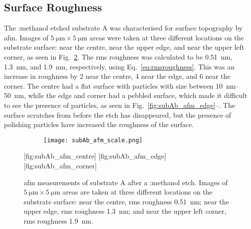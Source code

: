 \subsection{Surface Roughness}

The :methanol etched substrate A was characterised for surface topography by \ac{afm}. Images of $\SI{5}{\micro\metre}\times\SI{5}{\micro\metre}$ areas were taken at three different locations on the substrate surface: near the centre, near the upper edge, and near the upper left corner, as seen in Fig.~\ref{fig:subAb_afm}. The \ac{rms} roughness was calculated to be \SI{0.51}{\nano\metre}, \SI{1.3}{\nano\metre}, and \SI{1.9}{\nano\metre}, respectively, using Eq.~\ref{eq:rmsroughness}. This was an increase in roughness by 2 near the centre, 4 near the edge, and 6 near the corner. The centre had a flat surface with particles with size between \SIrange{10}{50}{\nano\metre}, while the edge and corner had a pebbled surface, which made it difficult to see the presence of particles, as seen in Fig.~\ref{fig:subAb_afm_edge}--. The surface scratches from before the etch has disappeared, but the presence of polishing particles have increased the roughness of the surface.

\begin{figure}[htbp]
    \centering
    \begin{subfigure}[c]{0.032\linewidth}
        \label{fig:subAb_afm_scale}\captionsetup{list=no}
        \texttt{[image: subAb\_afm\_scale.png]}
    \end{subfigure}
    \hfill
    [fig:subAb_afm_centre] %
    \hfill
    [fig:subAb_afm_edge] %
    \hfill
    [fig:subAb_afm_corner]%
    \caption[\Ac{afm} of substrate A after a :methanol etch.]{\Ac{afm} measurements of substrate A after a :methanol etch. Images of $\SI{5}{\micro\metre}\times\SI{5}{\micro\metre}$ areas are taken at three different locations on the substrate surface:  near the centre, \ac{rms} roughness \SI{0.51}{\nano\metre};  near the upper edge, \ac{rms} roughness \SI{1.3}{\nano\metre}; and  near the upper left corner, \ac{rms} roughness \SI{1.9}{\nano\metre}.}\label{fig:subAb_afm}
\end{figure} %

